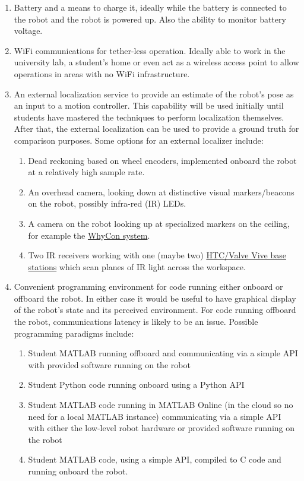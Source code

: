 \documentclass[11pt,fleqn]{article}
\begin{document}
\begin{enumerate}
\item Battery and a means to charge it, ideally while the battery is connected to the robot and the robot is powered up.  Also the
ability to monitor battery voltage.
  \item WiFi communications for tether-less operation. Ideally able to work in the university lab, a student's home or even act as a wireless access point to allow operations in areas with no WiFi infrastructure.

\item An external localization service to provide an estimate of the robot's pose as an input to a motion controller.  This capability will be used initially until students have mastered the techniques to perform localization themselves.  After that, the external localization can be used to provide a ground truth for comparison purposes.  Some options for an external localizer include:
\begin{enumerate}
\item Dead reckoning based on wheel encoders, implemented onboard the robot at a relatively high sample rate.
\item An overhead camera, looking down at distinctive visual markers/beacons on the robot, possibly infra-red (IR) LEDs.
\item A camera on the robot looking up at specialized markers on the ceiling, for example the \href{https://github.com/gestom/whycon-orig.git}{WhyCon system}.
\item Two IR receivers working with one (maybe two) \href{https://en.wikipedia.org/wiki/HTC_Vive}{HTC/Valve Vive base stations} which scan planes of IR light across the workspace.
\end{enumerate}

\item Convenient programming environment for code running either onboard or offboard the robot.  In either case it would be useful to have graphical display of the robot's state and its perceived environment.  For code running offboard the robot, communications latency is likely to be an issue.
Possible programming paradigms include:
\begin{enumerate}
\item Student MATLAB running offboard and communicating via a simple API with provided software running on the  robot 
\item Student Python code running onboard using a Python API
\item Student MATLAB code running in MATLAB Online (in the cloud so no need for a local MATLAB instance) communicating via a simple API with either the low-level robot hardware or provided software running on the robot 
\item Student MATLAB code, using a simple API, compiled to C code and running onboard the robot.
\end{enumerate}

\end{enumerate}
\end{document}
